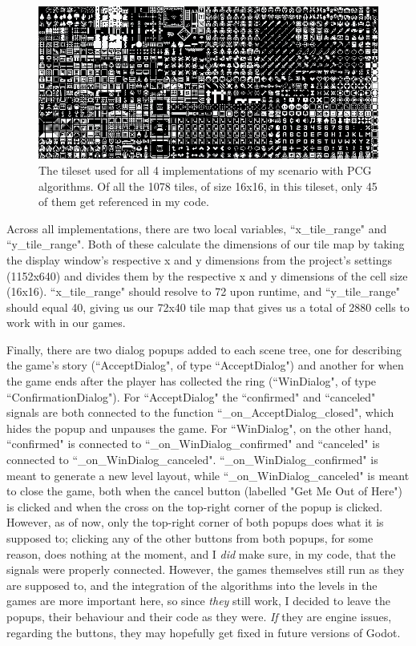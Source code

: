 \begin{figure}[H]
    \centering
    \includegraphics[width=\textwidth]{Images/monochrome_packed.png}
    \caption{The tileset used for all 4 implementations of my scenario with PCG algorithms.\cite{kenneyassetsused} Of all the 1078 tiles, of size 16x16, in this tileset, only 45 of them get referenced in my code.}
    \label{fig:kenneyset}
\end{figure}

Across all implementations, there are two local variables, ``x\_tile\_range" and ``y\_tile\_range". Both of these calculate the dimensions of our tile map by taking the display window's respective x and y dimensions from the project's settings (1152x640) and divides them by the respective x and y dimensions of the cell size (16x16). ``x\_tile\_range" should resolve to 72 upon runtime, and ``y\_tile\_range" should equal 40, giving us our 72x40 tile map that gives us a total of 2880 cells to work with in our games.

Finally, there are two dialog popups added to each scene tree, one for describing the game's story (``AcceptDialog", of type ``AcceptDialog") and another for when the game ends after the player has collected the ring (``WinDialog", of type ``ConfirmationDialog"). For ``AcceptDialog" the ``confirmed" and ``canceled" signals are both connected to the function ``\_on\_AcceptDialog\_closed", which hides the popup and unpauses the game. For ``WinDialog", on the other hand, ``confirmed" is connected to ``\_on\_WinDialog\_confirmed" and ``canceled" is connected to ``\_on\_WinDialog\_canceled". ``\_on\_WinDialog\_confirmed" is meant to generate a new level layout, while ``\_on\_WinDialog\_canceled" is meant to close the game, both when the cancel button (labelled "Get Me Out of Here") is clicked and when the cross on the top-right corner of the popup is clicked. However, as of now, only the top-right corner of both popups does what it is supposed to; clicking any of the other buttons from both popups, for some reason, does nothing at the moment, and I \textit{did} make sure, in my code, that the signals were properly connected. However, the games themselves still run as they are supposed to, and the integration of the algorithms into the levels in the games are more important here, so since \textit{they} still work, I decided to leave the popups, their behaviour and their code as they were. \textit{If} they are engine issues, regarding the buttons, they may hopefully get fixed in future versions of Godot.


